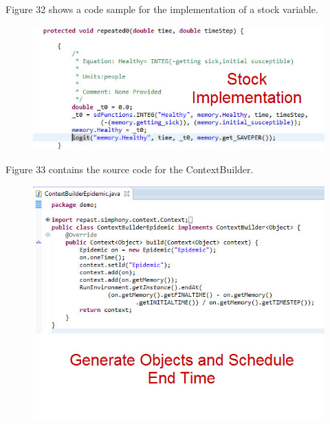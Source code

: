 \documentclass[11pt]{amsart}
\begin{document}
Figure 32 shows a code sample for the implementation of a stock variable.

\begin{figure}[ht]
\begin{center}
\vspace{.2in}
\centerline {
\includegraphics[totalheight=0.3\textheight]{images/030.jpg}
}
\caption{}
\label{fig:030}
\end{center}
\end{figure}

Figure 33 contains the source code for the ContextBuilder.

\begin{figure}[ht]
\begin{center}
\vspace{.2in}
\centerline {
\includegraphics[totalheight=0.3\textheight]{images/031.jpg}
}
\caption{}
\label{fig:031}
\end{center}
\end{figure}
\end{document}
